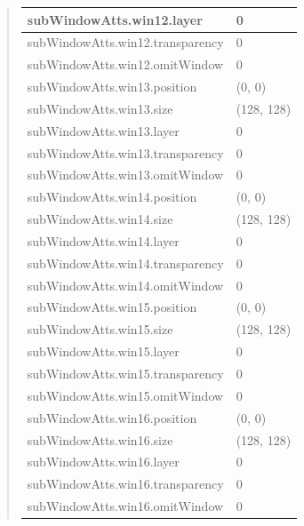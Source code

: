 \documentclass[letterpaper,10pt,english]{sphinxmanual}
\begin{document}
\begin{quote}
\begin{longtable}{|l|l|}
\hline
subWindowAtts.win12.layer
 & 
0
\\
\hline
subWindowAtts.win12.transparency
 & 
0
\\
\hline
subWindowAtts.win12.omitWindow
 & 
0
\\
\hline
subWindowAtts.win13.position
 & 
(0, 0)
\\
\hline
subWindowAtts.win13.size
 & 
(128, 128)
\\
\hline
subWindowAtts.win13.layer
 & 
0
\\
\hline
subWindowAtts.win13.transparency
 & 
0
\\
\hline
subWindowAtts.win13.omitWindow
 & 
0
\\
\hline
subWindowAtts.win14.position
 & 
(0, 0)
\\
\hline
subWindowAtts.win14.size
 & 
(128, 128)
\\
\hline
subWindowAtts.win14.layer
 & 
0
\\
\hline
subWindowAtts.win14.transparency
 & 
0
\\
\hline
subWindowAtts.win14.omitWindow
 & 
0
\\
\hline
subWindowAtts.win15.position
 & 
(0, 0)
\\
\hline
subWindowAtts.win15.size
 & 
(128, 128)
\\
\hline
subWindowAtts.win15.layer
 & 
0
\\
\hline
subWindowAtts.win15.transparency
 & 
0
\\
\hline
subWindowAtts.win15.omitWindow
 & 
0
\\
\hline
subWindowAtts.win16.position
 & 
(0, 0)
\\
\hline
subWindowAtts.win16.size
 & 
(128, 128)
\\
\hline
subWindowAtts.win16.layer
 & 
0
\\
\hline
subWindowAtts.win16.transparency
 & 
0
\\
\hline
subWindowAtts.win16.omitWindow
 & 
0
\\
\hline\end{longtable}

\end{quote}

\begin{DUlineblock}{0em}
\item[] 
\end{DUlineblock}

\begin{DUlineblock}{0em}
\item[] 
\end{DUlineblock}
\end{document}
